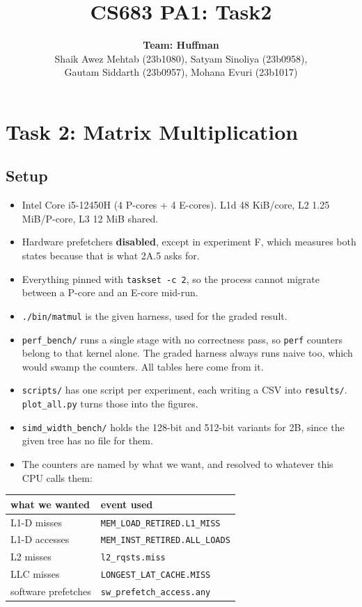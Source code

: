\documentclass[
  10pt,
]{article}
\title{CS683 PA1: Task2}
\author{\textbf{Team: Huffman} \\[3pt]
  Shaik Awez Mehtab (23b1080), Satyam Sinoliya (23b0958), \\
  Gautam Siddarth (23b0957), Mohana Evuri (23b1017)}
\date{}
\newcounter{none} %
\providecommand{\tightlist}{%
  \setlength{\itemsep}{0pt}\setlength{\parskip}{0pt}}
\begin{document}
\maketitle
\section{Task 2: Matrix Multiplication}\label{task-2-matmul}

\subsection{Setup}\label{setup2}

\begin{itemize}
\tightlist
\item
  Intel Core i5-12450H (4 P-cores + 4 E-cores). L1d 48 KiB/core, L2 1.25
  MiB/P-core, L3 12 MiB shared.
\item
  Hardware prefetchers \textbf{disabled}, except in experiment F, which
  measures both states because that is what 2A.5 asks for.
\item
  Everything pinned with \texttt{taskset\ -c\ 2}, so the process cannot
  migrate between a P-core and an E-core mid-run.
\item
  \texttt{./bin/matmul} is the given harness, used for the graded result.
\item
  \texttt{perf\_bench/} runs a single stage with no correctness pass, so
  \texttt{perf} counters belong to that kernel alone. The graded harness always
  runs naive too, which would swamp the counters. All tables here come from it.
\item
  \texttt{scripts/} has one script per experiment, each writing a CSV into
  \texttt{results/}. \texttt{plot\_all.py} turns those into the figures.
\item
  \texttt{simd\_width\_bench/} holds the 128-bit and 512-bit variants for 2B,
  since the given tree has no file for them.
\item
  The counters are named by what we want, and resolved to whatever this CPU
  calls them:
\end{itemize}

{\def\LTcaptype{none} %
\begin{longtable}[]{@{}ll@{}}
\toprule\noalign{}
what we wanted & event used \\
\midrule\noalign{}
\endhead
\bottomrule\noalign{}
\endlastfoot
L1-D misses & \texttt{MEM\_LOAD\_RETIRED.L1\_MISS} \\
L1-D accesses & \texttt{MEM\_INST\_RETIRED.ALL\_LOADS} \\
L2 misses & \texttt{l2\_rqsts.miss} \\
LLC misses & \texttt{LONGEST\_LAT\_CACHE.MISS} \\
software prefetches & \texttt{sw\_prefetch\_access.any} \\
\end{longtable}
}
\end{document}
